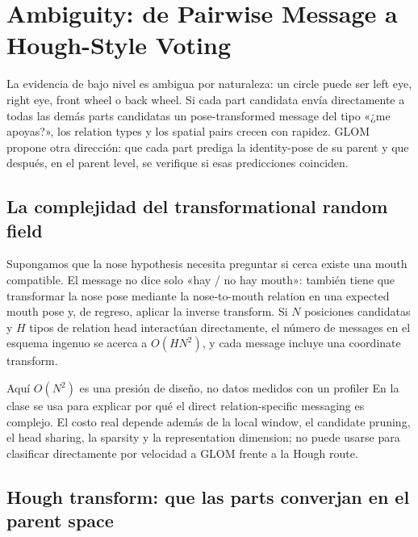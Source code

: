 \section{Ambiguity: de Pairwise Message a Hough-Style Voting}

La evidencia de bajo nivel es ambigua por naturaleza: un circle puede ser left eye, right eye, front wheel o back wheel. Si cada part candidata envía directamente a todas las demás parts candidatas un pose-transformed message del tipo «¿me apoyas?», los relation types y los spatial pairs crecen con rapidez. GLOM propone otra dirección: que cada part prediga la identity-pose de su parent y que después, en el parent level, se verifique si esas predicciones coinciden.


\subsection{La complejidad del transformational random field}

Supongamos que la nose hypothesis necesita preguntar si cerca existe una mouth compatible. El message no dice solo «hay / no hay mouth»: también tiene que transformar la nose pose mediante la nose-to-mouth relation en una expected mouth pose y, de regreso, aplicar la inverse transform. Si $N$ posiciones candidatas y $H$ tipos de relation head interactúan directamente, el número de messages en el esquema ingenuo se acerca a $O(HN^2)$, y cada message incluye una coordinate transform.

\begin{warningbox}{Aquí $O(N^2)$ es una presión de diseño, no datos medidos con un profiler}
En la clase se usa para explicar por qué el direct relation-specific messaging es complejo. El costo real depende además de la local window, el candidate pruning, el head sharing, la sparsity y la representation dimension; no puede usarse para clasificar directamente por velocidad a GLOM frente a la Hough route.
\end{warningbox}

\subsection{Hough transform: que las parts converjan en el parent space}

